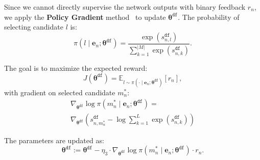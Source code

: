 Since we cannot directly supervise the network outputs with binary feedback $r_n$, we apply the \textbf{Policy Gradient} method~\cite{ban2021multi} to update \( \boldsymbol{\theta}^{\texttt{df}} \). The probability of selecting candidate \( l \) is:
\begin{equation}
    \pi(l \mid \mathbf{e}_n; \boldsymbol{\theta}^{\texttt{df}}) = \frac{\exp\left( s_{n,l}^{\texttt{df}} \right)}{\sum_{k=1}^{|M|} \exp\left( s_{n,k}^{\texttt{df}} \right)}.
\end{equation}

The goal is to maximize the expected reward:
\begin{equation}
    J(\boldsymbol{\theta}^{\texttt{df}}) = \mathbb{E}_{l \sim \pi(\cdot \mid \mathbf{e}_n; \boldsymbol{\theta}^{\texttt{df}})} [ r_n ],
\end{equation}
with gradient on selected candidate $m_n^*$:
\begin{multline}
    \nabla_{\boldsymbol{\theta}^{\texttt{df}}} \log \pi(m_n^* \mid \mathbf{e}_n; \boldsymbol{\theta}^{\texttt{df}}) = \\
    \nabla_{\boldsymbol{\theta}^{\texttt{df}}} \left( s_{n,m_n^*}^{\texttt{df}} - \log \sum_{k=1}^L \exp\left( s_{n,k}^{\texttt{df}} \right) \right)
\end{multline}

The parameters are updated as:
\begin{equation}
    \boldsymbol{\theta}^{\texttt{df}} := \boldsymbol{\theta}^{\texttt{df}} - \eta_3 \cdot \nabla_{\boldsymbol{\theta}^{\texttt{df}}} \log \pi(m_n^* \mid \mathbf{e}_n; \boldsymbol{\theta}^{\texttt{df}}) \cdot r_n.
\end{equation}



